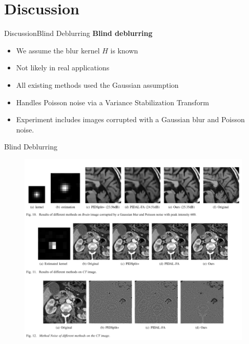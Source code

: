 \documentclass{beamer}
\begin{document}





\section{Discussion}
\begin{frame}[t]{Discussion}{Blind Deblurring}
\textbf{Blind deblurring}\\
\begin{itemize}
    \item We assume the blur kernel $H$ is known
    \item Not likely in real applications
    \item All existing methods used the Gaussian assumption
    \item Handles Poisson noise via a Variance Stabilization Transform
    \item Experiment includes images corrupted with a Gaussian blur and Poisson noise.
\end{itemize}
\end{frame}

\begin{frame}{Blind Deblurring}

\begin{figure}
    \centering
    \includegraphics[scale = 0.45]{Result_Sec2.PNG}
    \caption{}
\end{figure}
    
\end{frame}
\end{document}
